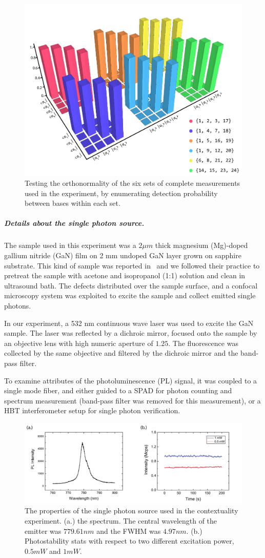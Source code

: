 \documentclass[pra,aps,notitlepage,superscriptaddress,showpacs,showkeys]{revtex4-1}
\theoremstyle{definition}
\theoremstyle{remark}
\begin{document}
 \begin{figure}[t]
     \centering
     \includegraphics[width = .53\columnwidth] {fig/exp-res-1.pdf}
     \caption{Testing the orthonormality of the six sets of complete measurements used in the experiment, by enumerating detection probability between bases within each set.}
     \label{fig:exp-res-1}
 \end{figure}

 \subparagraph{Details about the single photon source.}
 The sample used in this experiment was a $2\mu m$ thick magnesium (Mg)-doped gallium nitride (GaN) film on 2 mm undoped GaN layer grown on sapphire substrate.
 This kind of sample was reported in~\cite{qli18s} and we followed their practice to pretreat the sample with acetone and isopropanol (1:1) solution and clean in ultrasound bath.
 The defects distributed over the sample surface, and a confocal microscopy system was exploited to excite the sample and collect emitted single photons.

 In our experiment, a 532 nm continuous wave laser was used to excite the GaN sample. The laser was reflected by a dichroic mirror, focused onto the sample by an objective lens with high numeric aperture of $1.25$. The fluorescence was collected by the same objective and filtered by the dichroic mirror and the band-pass filter.

 To examine attributes of the photoluminescence (PL) signal, it was coupled to a single mode fiber, and either guided to a SPAD for photon counting and spectrum measurement (band-pass filter was removed for this measurement), or a HBT interferometer setup for single photon verification.

 \begin{figure}[t]
     \centering
     \includegraphics[width = .96 \linewidth]{fig/exp-sauce.pdf}
     \caption{The properties of the single photon source used in the contextuality experiment. (a.) the spectrum. The central wavelength of the emitter was $779.61nm$ and the FWHM was $4.97nm$. (b.) Photostability stats with respect to two different excitation power, $0.5mW$ and $1mW$.}
     \label{fig:exp-sauce}
 \end{figure}
\end{document}
